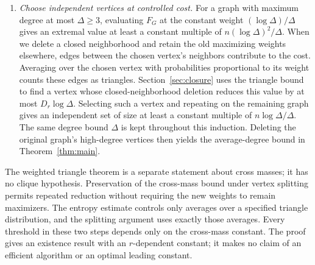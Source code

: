 \begin{enumerate}
\item \emph{Choose independent vertices at controlled cost.}
For a graph with maximum degree at most $\Delta\ge3$, evaluating $F_G$ at
the constant weight $(\log\Delta)/\Delta$ gives an extremal value at
least a constant multiple of $n(\log\Delta)^2/\Delta$.
When we delete a closed neighborhood and retain the old maximizing weights
elsewhere, edges between the chosen vertex's neighbors contribute to
the cost. Averaging over the chosen vertex with probabilities proportional
to its weight counts these edges as triangles.
Section~\ref{sec:closure} uses the triangle bound to find a vertex whose
closed-neighborhood deletion reduces this value by at most
$D_r\log\Delta$. Selecting such a vertex and repeating on the remaining
graph gives an independent set of size at least a constant multiple of
$n\log\Delta/\Delta$. The same degree bound $\Delta$ is kept throughout
this induction. Deleting the original graph's high-degree vertices then
yields the average-degree bound in Theorem~\ref{thm:main}.
\end{enumerate}

The weighted triangle theorem is a separate statement about cross masses;
it has no clique hypothesis. Preservation of the cross-mass bound under
vertex splitting permits repeated reduction without requiring the new weights to
remain maximizers. The entropy estimate controls only averages over a
specified triangle distribution, and the splitting argument uses exactly
those averages. Every threshold in these two steps depends only on the
cross-mass constant. The proof gives an existence result with an
$r$-dependent constant; it makes no claim of an efficient algorithm or
an optimal leading constant.
